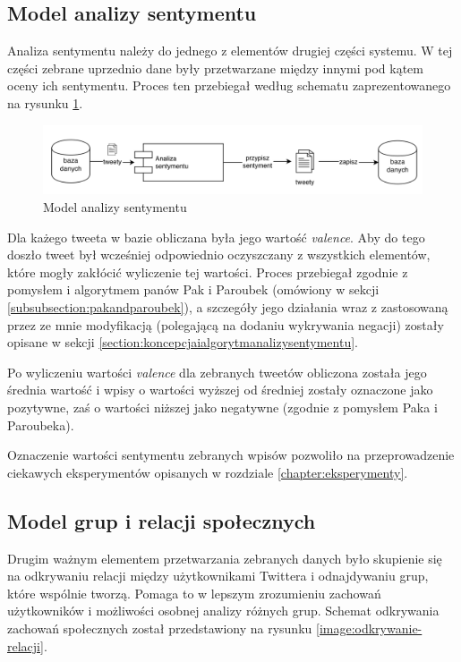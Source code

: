 \subsection{Model analizy sentymentu}
\label{subsection:modelanalizysentymentu}

Analiza sentymentu należy do jednego z elementów drugiej części systemu.
W tej części zebrane uprzednio dane były przetwarzane między innymi pod kątem
oceny ich sentymentu. Proces ten przebiegał według schematu
zaprezentowanego na rysunku \ref{image:model-analizy-sentymentu}.

\begin{figure}[ht!]
\centering
\includegraphics[width=160mm]{img/model-analizy-sentymentu.png}
\caption{Model analizy sentymentu}
\label{image:model-analizy-sentymentu}
\end{figure}


Dla każego tweeta w bazie obliczana była jego wartość \textit{valence}.
Aby do tego doszło tweet był wcześniej odpowiednio oczyszczany z wszystkich
elementów, które mogły zakłócić wyliczenie tej wartości. Proces przebiegał
zgodnie z pomysłem i algorytmem panów Pak i Paroubek (omówiony w sekcji
\ref{subsubsection:pakandparoubek}), a szczegóły jego działania wraz z
zastosowaną przez ze mnie modyfikacją (polegającą na dodaniu wykrywania negacji)
zostały opisane w sekcji \ref{section:koncepcjaialgorytmanalizysentymentu}.

Po wyliczeniu wartości \textit{valence} dla zebranych tweetów obliczona została
jego średnia wartość i wpisy o wartości wyższej od średniej zostały oznaczone
jako pozytywne, zaś o wartości niższej jako negatywne (zgodnie z pomysłem Paka
i Paroubeka).

Oznaczenie wartości sentymentu zebranych wpisów pozwoliło na przeprowadzenie
ciekawych eksperymentów opisanych w rozdziale \ref{chapter:eksperymenty}.


\subsection{Model grup i relacji społecznych}
\label{subsection:modelgrupirelacjispolecznych}
Drugim ważnym elementem przetwarzania zebranych danych było skupienie się na
odkrywaniu relacji między użytkownikami Twittera i odnajdywaniu grup, które
wspólnie tworzą. Pomaga to w lepszym zrozumieniu zachowań użytkowników i
możliwości osobnej analizy różnych grup. Schemat odkrywania zachowań społecznych
został przedstawiony na rysunku \ref{image:odkrywanie-relacji}.


